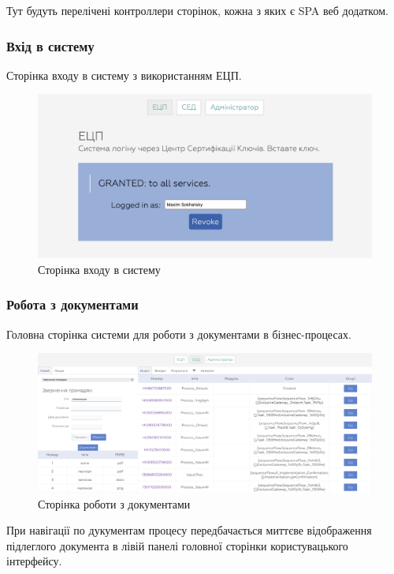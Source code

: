Тут будуть перелічені контроллери сторінок, кожна з яких є SPA веб додатком.

\subsubsection{Вхід в систему}

Сторінка входу в систему з використанням ЕЦП.

\begin{figure}[!htbp]
\centerline{\includegraphics[scale=0.4]{ldap.png}}
\caption{Сторінка входу в систему}
\end{figure}

\newpage
\subsubsection{Робота з документами}

Головна сторінка системи для роботи з документами в бізнес-процесах.

\begin{figure}[!htbp]
\centerline{\includegraphics[scale=0.2]{crm.png}}
\caption{Сторінка роботи з документами}
\end{figure}

При навігації по дукументам процесу передбачається миттєве відображення підлеглого
документа в лівій панелі головної сторінки користувацького інтерфейсу.


